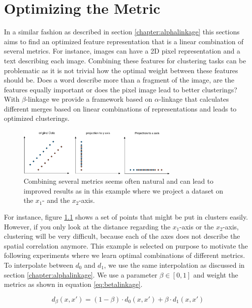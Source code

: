 \chapter{Optimizing the Metric}
\label{sec:beta}

In a similar fashion as described in section \ref{chapter:alphalinkage} this sections aims to find an optimized feature representation that is a linear combination of several metrics. For instance, images can have a 2D pixel representation and a text describing each image. Combining these features for clustering tasks can be problematic as it is not trivial how the optimal weight between these features should be. Does a word describe more than a fragment of the image, are the features equally important or does the pixel image lead to better clusterings? With $\beta$-linkage we provide a framework based on $\alpha$-linkage that calculates different merges based on linear combinations of representations and leads to optimized clusterings.

\begin{figure}[h]
    \centering
    \includegraphics[width=0.7\textwidth]{images/ExampleDataset}
    \caption{Combining several metrics seems often natural and can lead to improved results as in this example where we project a dataset on the $x_1$- and the $x_2$-axis.}
    \label{fig:metrics}
\end{figure}

For instance, figure \ref{fig:metrics} shows a set of points that might be put in clusters easily. However, if you only look at the distance regarding the $x_1$-axis or the $x_2$-axis, clustering will be very difficult, because each of the axes does not describe the spatial correlation anymore. This example is selected on purpose to motivate the following experiments where we learn optimal combinations of different metrics.\\ 

To interpolate between $d_0$ and $d_1$, we use the same interpolation as discussed in section \ref{chapter:alphalinkage}. We use a parameter $\beta \in [0,1]$ and weight the metrics as shown in equation \ref{eq:betalinkage}.

\begin{equation}
d_\beta(x,x') = (1 - \beta) \cdot d_0(x,x') + \beta \cdot d_1(x,x')
\label{eq:betalinkage}
\end{equation}

